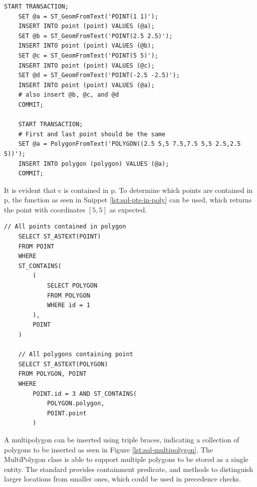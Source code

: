 \begin{center}
\noindent\begin{minipage}{.85\textwidth}
\begin{lstlisting}[caption={Insert four points and one polygon in MySQL.}, label={lst:sql-insert-points}]
	START TRANSACTION;
	SET @a = ST_GeomFromText('POINT(1 1)');
	INSERT INTO point (point) VALUES (@a);
	SET @b = ST_GeomFromText('POINT(2.5 2.5)');
	INSERT INTO point (point) VALUES (@b);
	SET @c = ST_GeomFromText('POINT(5 5)');
	INSERT INTO point (point) VALUES (@c);
	SET @d = ST_GeomFromText('POINT(-2.5 -2.5)');
	INSERT INTO point (point) VALUES (@a);
	# also insert @b, @c, and @d
	COMMIT;

	START TRANSACTION;
	# First and last point should be the same
	SET @a = PolygonFromText('POLYGON((2.5 5,5 7.5,7.5 5,5 2.5,2.5 5))');
	INSERT INTO polygon (polygon) VALUES (@a);
	COMMIT;
\end{lstlisting}
\end{minipage}
\end{center}

It is evident that c is contained in p. To determine which points are contained in p, the function as seen in Snippet \ref{lst:sql-pts-in-poly} can be used, which returns the point with coordinates $[5, 5]$ as expected.

\begin{center}
\noindent\begin{minipage}{.85\textwidth}
\begin{lstlisting}[caption={Select points contained in polygon, and all polygons containing a point in MySQL.}, label={lst:sql-pts-in-poly}]
	// All points contained in polygon
	SELECT ST_ASTEXT(POINT)
	FROM POINT
	WHERE
	ST_CONTAINS(
		(
			SELECT POLYGON
			FROM POLYGON
			WHERE id = 1
		),
		POINT
	)

	// All polygons containing point
	SELECT ST_ASTEXT(POLYGON)
	FROM POLYGON, POINT
	WHERE
		POINT.id = 3 AND ST_CONTAINS(
			POLYGON.polygon,
			POINT.point
		)
\end{lstlisting}
\end{minipage}
\end{center}

A multipolygon can be inserted using triple braces, indicating a collection of polygons to be inserted as seen in Figure \ref{lst:sql-multipolygon}. The MultiPolygon class is able to support multiple polygons to be stored as a single entity. The standard provides containment predicate, and methods to distinguish larger locations from smaller ones, which could be used in precedence checks.

